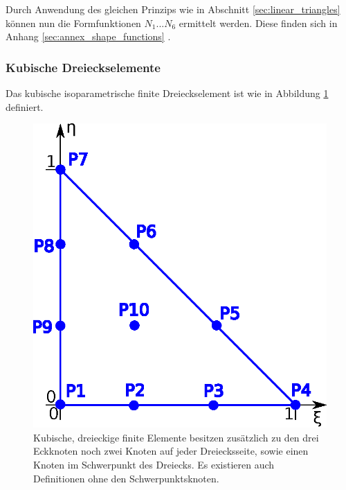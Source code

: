Durch Anwendung des gleichen Prinzips wie in Abschnitt \ref{sec:linear_triangles} können nun die Formfunktionen $N_1 \text{...} N_6$ ermittelt werden. Diese finden sich in Anhang \ref{sec:annex_shape_functions} .





\subsubsection{Kubische Dreieckselemente}

Das kubische isoparametrische finite Dreieckselement ist wie in Abbildung \ref{fig:cubic_element} definiert.

\begin{figure}[htbp]
	\begin{center}
		\includegraphics[scale=0.65]{pics/cubic_element.eps}
	\end{center}
	\caption{Kubische, dreieckige finite Elemente besitzen zusätzlich zu den drei Eckknoten noch zwei Knoten auf jeder Dreiecksseite, sowie einen Knoten im Schwerpunkt des Dreiecks. Es existieren auch Definitionen ohne den Schwerpunktsknoten.}
	\label{fig:cubic_element}
\end{figure}

